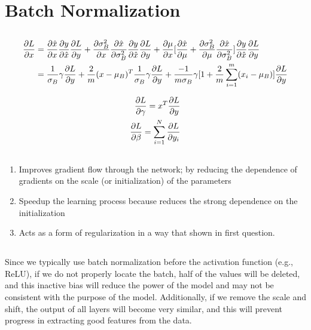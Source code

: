 \documentclass{article}
\begin{document}
\section{Batch Normalization}

\subsection{}
\begin{align*}
    \pdv{L}{x} 
    &= \pdv{\hat{x}}{x} \pdv{y}{\hat{x}} \pdv{L}{y} 
    + \pdv{\sigma_B^2}{x}\pdv{\hat{x}}{\sigma_B^2}\pdv{y}{\hat{x}} \pdv{L}{y}
    + \pdv{\mu}{x} [ \pdv{\hat{x}}{\mu} + \pdv{\sigma_B^2}{\mu}\pdv{\hat{x}}{{\sigma_B^2}}] \pdv{y}{\hat{x}} \pdv{L}{y} \\
    &= \frac{1}{\sigma_B} \gamma \pdv{L}{y}
    + \frac{2}{m}(x - \mu_B)^T\frac{1}{\sigma_B} \gamma \pdv{L}{y}
    + \frac{-1}{m\sigma_B} \gamma[1 + \frac{2}{m}\sum_{i=1}^{m}(x_i - \mu_B)] \pdv{L}{y}
\end{align*}

\begin{align*}
    \pdv{L}{\gamma} = x^T \pdv{L}{y} \\
    \pdv{L}{\beta} = \sum_{i = 1}^{N} \pdv{L}{y_i}
\end{align*}


\subsection{}
\begin{enumerate}
    \item Improves gradient flow through the network; by reducing the dependence of gradients on the scale (or initialization) of the
    parameters
    \item Speedup the learning process because reduces the strong dependence on the initialization
    \item Acts as a form of regularization in a way that shown in first question.
\end{enumerate}


\subsection{}
Since we typically use batch normalization before the activation function 
(e.g., ReLU), if we do not properly locate the batch, half of the values will
be deleted, and this inactive bias will reduce the power of the model and may
not be consistent with the purpose of the model. Additionally, if we remove
the scale and shift, the output of all layers will become very similar,
and this will prevent progress in extracting good features from the data.
\end{document}
